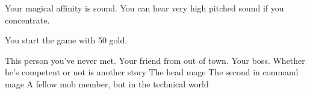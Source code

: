 \documentclass[char]{guildcamp3}
\begin{document}
\begin{itemz}[Notes]
	\item Your magical affinity is sound. You can hear very high pitched sound if you concentrate.
	\item You start the game with 50 gold. 
\end{itemz}

\begin{contacts}
  \contact{\cNPC{}} This person you've never met.
  \contact{\cSomeGuy{}} Your friend from out of town.
  \contact{\cNobleOne{}} Your boss. Whether he's competent or not is another story
  \contact{\cMageOne{}} The head mage
  \contact{\cMageTwo{}} The second in command mage
  \contact{\cSciOne{}} A fellow mob member, but in the technical world
\end{contacts}
\end{document}
